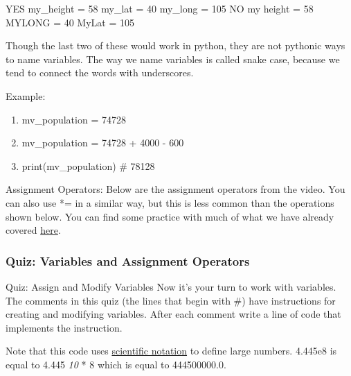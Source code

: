 \documentclass[11pt]{article}
\providecommand{\tightlist}{%
      \setlength{\itemsep}{0pt}\setlength{\parskip}{0pt}}
\begin{document}
YES my\_height = 58 my\_lat = 40 my\_long = 105 NO my height = 58 MYLONG
= 40 MyLat = 105

Though the last two of these would work in python, they are not pythonic
ways to name variables. The way we name variables is called snake case,
because we tend to connect the words with underscores.

    Example:

\begin{enumerate}
\def\labelenumi{\arabic{enumi}.}
\tightlist
\item
  mv\_population = 74728
\item
  mv\_population = 74728 + 4000 - 600
\item
  print(mv\_population) \# 78128
\end{enumerate}

Assignment Operators: Below are the assignment operators from the video.
You can also use *= in a similar way, but this is less common than the
operations shown below. You can find some practice with much of what we
have already covered
\href{https://www.programiz.com/python-programming/operators}{here}.

    

    \hypertarget{quiz-variables-and-assignment-operators}{%
\subsubsection{Quiz: Variables and Assignment
Operators}\label{quiz-variables-and-assignment-operators}}

Quiz: Assign and Modify Variables Now it's your turn to work with
variables. The comments in this quiz (the lines that begin with \#) have
instructions for creating and modifying variables. After each comment
write a line of code that implements the instruction.

Note that this code uses
\href{https://en.wikipedia.org/wiki/Scientific_notation}{scientific
notation} to define large numbers. 4.445e8 is equal to 4.445 \emph{10} *
8 which is equal to 444500000.0.
\end{document}
